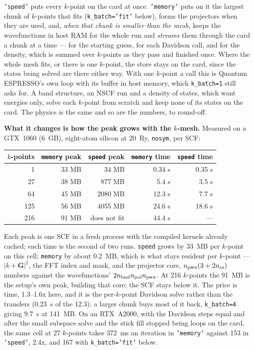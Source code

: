 \documentclass[11pt,a4paper]{article}
\newcommand{\qe}{Quantum ESPRESSO}
\newcommand{\code}[1]{\texttt{\small #1}}
\begin{document}
\code{'speed'} puts every $k$-point on the card at once. \code{'memory'} puts
on it the largest chunk of $k$-points that fits (\code{k\_batch='fit'} below),
forms the projectors when they are used, and, \emph{when that chunk is smaller
than the mesh}, keeps the wavefunctions in host RAM for the whole run and
\emph{streams} them through the card a chunk at a time --- for the starting
guess, for each Davidson call, and for the density, which is summed over
$k$-points as they pass and finished once. Where the whole mesh fits, or there is
one $k$-point, the store stays on the card, since the states being solved are
there either way. With one $k$-point a call this is \qe's own loop with its
buffer in host memory, which \code{k\_batch=1} still asks for.
A band structure, an NSCF run and a density of states, which want energies only,
solve each $k$-point from scratch and keep none of its states on the card.
The physics is the same and so are the numbers, to round-off.

\textbf{What it changes is how the peak grows with the $k$-mesh.} Measured on a
GTX~1060 (6~GB), eight-atom silicon at 20~Ry, \code{nosym}, per SCF:

\begin{center}
\begin{tabular}{rrrrr}
\toprule
$k$-points & \code{memory} peak & \code{speed} peak & \code{memory} time & \code{speed} time \\
\midrule
  1 &  33 MB &   34 MB &  0.34 s &  0.35 s \\
 27 &  38 MB &  877 MB &  5.4 s  &  3.5 s  \\
 64 &  45 MB & 2080 MB & 12.3 s  &  7.7 s  \\
125 &  56 MB & 4055 MB & 24.6 s  & 18.6 s  \\
216 &  91 MB & does not fit & 44.4 s & --- \\
\bottomrule
\end{tabular}
\end{center}

\noindent Each peak is one SCF in a fresh process with the compiled kernels
already cached; each time is the second of two runs. \code{speed} grows by
33~MB per $k$-point on this cell; \code{memory} by about 0.2~MB, which is what
stays resident per $k$-point --- $|k+\mathbf G|^2$, the FFT index and mask, and
the projector core, $n_{\rm pwx}(3 + 2n_{\rm cs})$ numbers against the
wavefunctions' $2n_{\rm bnd}n_{\rm pol}n_{\rm pwx}$. At 216 $k$-points the
91~MB is the setup's own peak, building that core; the SCF stays below it. The price is time, 1.3--1.6x here, and it
is the per-$k$-point Davidson solve rather than the transfers (0.23~s of the
12.3): a larger chunk buys most of it back, \code{k\_batch=4} giving 9.7~s at
141~MB. On an RTX~A2000, with the Davidson steps equal and after the small
subspace solve and the stick fill stopped being loops on the card, the same cell
at 27 $k$-points takes 372~ms an iteration in \code{'memory'} against 153 in
\code{'speed'}, 2.4x, and 167 with \code{k\_batch='fit'} below.
\end{document}
